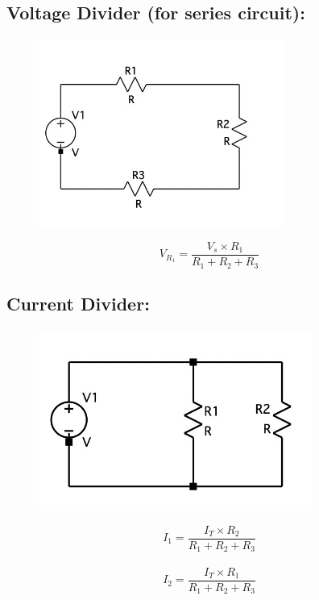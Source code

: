 \documentclass[a4paper,12]{article}
\begin{document}
\subsection{Voltage Divider (for series circuit):}
\begin{figure}[H]
	\centering
	\includegraphics[width=80mm]{Image/3.jpg}
\end{figure}
\[V_{R_1}=\frac{V_s\times R_1}{R_1+R_2+R_3}\]

\subsection{Current Divider:}
\begin{figure}[H]
	\centering
	\includegraphics[width=90mm]{Image/4.jpg}
\end{figure}
\[I_{1}=\frac{I_T\times R_2}{R_1+R_2+R_3}\]\\
\[I_{2}=\frac{I_T\times R_1}{R_1+R_2+R_3}\]
\end{document}
